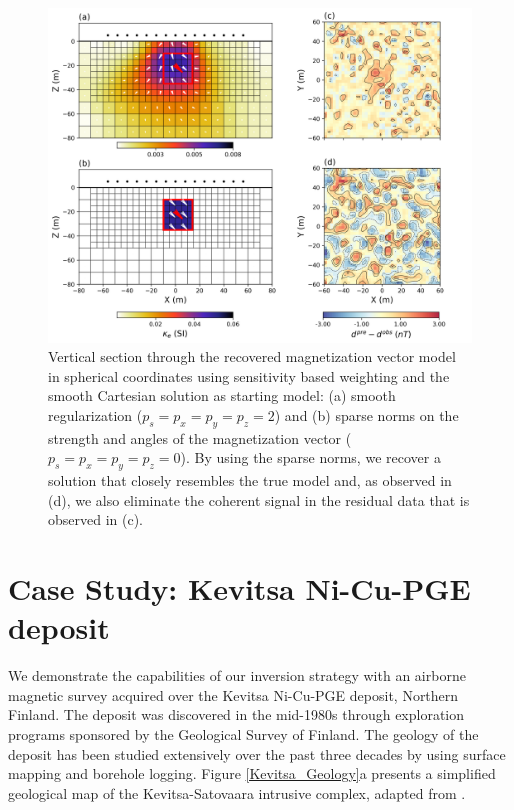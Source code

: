\documentclass[paper]{geophysics}
\begin{document}
\begin{figure}[p!]
\includegraphics[width=\columnwidth]{Figures/Figure7.png}
\caption{Vertical section through the recovered magnetization vector model in spherical coordinates using sensitivity based weighting and the smooth Cartesian solution as starting model: (a) smooth regularization ($p_s=p_x=p_y=p_z = 2$) and (b) sparse norms on the strength and angles of the magnetization vector ($p_s=p_x=p_y=p_z = 0$). By using the sparse norms, we recover a solution that closely resembles the true model and, as observed in (d), we also eliminate the coherent signal in the residual data that is observed in (c).}
\label{MVI_S_model_lp}
\end{figure}

\section{Case Study: Kevitsa Ni-Cu-PGE deposit}
We demonstrate the capabilities of our inversion strategy with an airborne magnetic survey acquired over the Kevitsa Ni-Cu-PGE deposit, Northern Finland.
The deposit was discovered in the mid-1980s through exploration programs sponsored by the Geological Survey of Finland.
The geology of the deposit has been studied extensively over the past three decades by using  surface mapping and borehole logging.
Figure \ref{Kevitsa_Geology}a presents a simplified geological map of the Kevitsa-Satovaara intrusive complex, adapted from \cite{Koivisto2015}.
\end{document}
